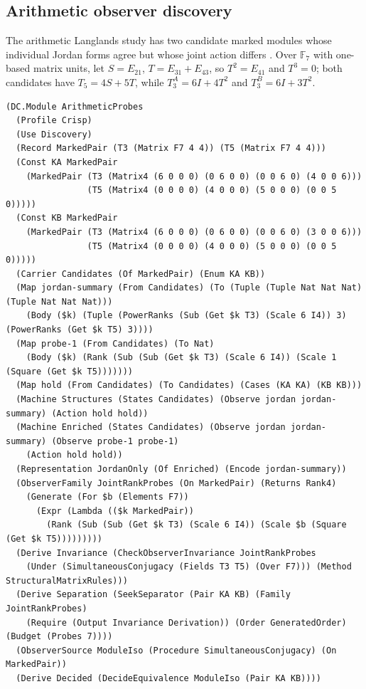 \documentclass[11pt]{article}
\newcommand{\F}{\mathbb{F}}
\theoremstyle{definition}
\theoremstyle{plain}
\begin{document}
\subsection{Arithmetic observer discovery}\label{sec:arith}

The arithmetic Langlands study has two candidate marked modules whose individual Jordan forms
agree but whose joint action differs \cite[Section~19]{langlands}. Over $\F_7$ with one-based matrix
units, let $S=E_{21}$, $T=E_{31}+E_{43}$, so $T^2=E_{41}$ and $T^3=0$; both candidates have
$T_5=4S+5T$, while $T_3^A=6I+4T^2$ and $T_3^B=6I+3T^2$.

\begin{lstlisting}[basicstyle=\ttfamily\footnotesize,title={\scriptsize\ttfamily fixtures/arithmetic\_probes.metta}]
(DC.Module ArithmeticProbes
  (Profile Crisp)
  (Use Discovery)
  (Record MarkedPair (T3 (Matrix F7 4 4)) (T5 (Matrix F7 4 4)))
  (Const KA MarkedPair
    (MarkedPair (T3 (Matrix4 (6 0 0 0) (0 6 0 0) (0 0 6 0) (4 0 0 6)))
                (T5 (Matrix4 (0 0 0 0) (4 0 0 0) (5 0 0 0) (0 0 5 0)))))
  (Const KB MarkedPair
    (MarkedPair (T3 (Matrix4 (6 0 0 0) (0 6 0 0) (0 0 6 0) (3 0 0 6)))
                (T5 (Matrix4 (0 0 0 0) (4 0 0 0) (5 0 0 0) (0 0 5 0)))))
  (Carrier Candidates (Of MarkedPair) (Enum KA KB))
  (Map jordan-summary (From Candidates) (To (Tuple (Tuple Nat Nat Nat) (Tuple Nat Nat Nat)))
    (Body ($k) (Tuple (PowerRanks (Sub (Get $k T3) (Scale 6 I4)) 3) (PowerRanks (Get $k T5) 3))))
  (Map probe-1 (From Candidates) (To Nat)
    (Body ($k) (Rank (Sub (Sub (Get $k T3) (Scale 6 I4)) (Scale 1 (Square (Get $k T5)))))))
  (Map hold (From Candidates) (To Candidates) (Cases (KA KA) (KB KB)))
  (Machine Structures (States Candidates) (Observe jordan jordan-summary) (Action hold hold))
  (Machine Enriched (States Candidates) (Observe jordan jordan-summary) (Observe probe-1 probe-1)
    (Action hold hold))
  (Representation JordanOnly (Of Enriched) (Encode jordan-summary))
  (ObserverFamily JointRankProbes (On MarkedPair) (Returns Rank4)
    (Generate (For $b (Elements F7))
      (Expr (Lambda (($k MarkedPair))
        (Rank (Sub (Sub (Get $k T3) (Scale 6 I4)) (Scale $b (Square (Get $k T5)))))))))
  (Derive Invariance (CheckObserverInvariance JointRankProbes
    (Under (SimultaneousConjugacy (Fields T3 T5) (Over F7))) (Method StructuralMatrixRules)))
  (Derive Separation (SeekSeparator (Pair KA KB) (Family JointRankProbes)
    (Require (Output Invariance Derivation)) (Order GeneratedOrder) (Budget (Probes 7))))
  (ObserverSource ModuleIso (Procedure SimultaneousConjugacy) (On MarkedPair))
  (Derive Decided (DecideEquivalence ModuleIso (Pair KA KB))))
\end{lstlisting}
\end{document}

